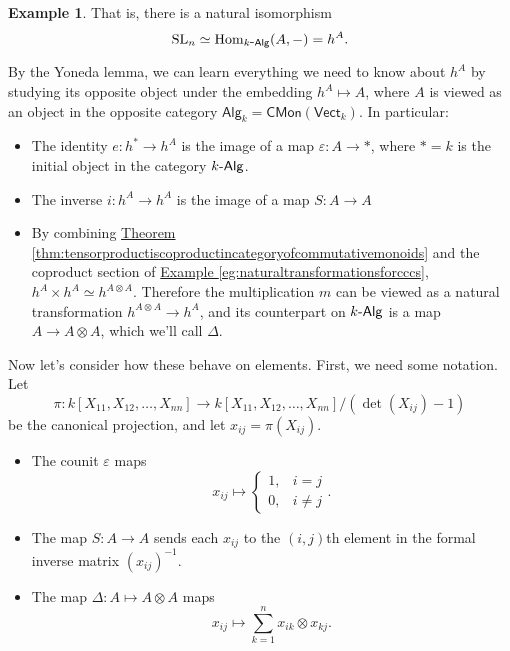 \documentclass[a4paper,10pt]{scrreprt}
\newcommand{\SL}{\mathrm{SL}}
\newcommand{\Hom}{\mathrm{Hom}}
\def\mhyp{{\hbox{-}}}
\theoremstyle{definition}
\newtheorem{example}{Example}[section]
\theoremstyle{plain}
\theoremstyle{remark}
\begin{document}
\begin{example}
  That is, there is a natural isomorphism 
  \begin{equation*}
    \SL_{n} \simeq \Hom_{k\mhyp\mathsf{Alg}}(A, -) = h^{A}.
  \end{equation*}

  By the Yoneda lemma, we can learn everything we need to know about $h^{A}$ by studying its opposite object under the embedding $h^{A} \mapsto A$, where $A$ is viewed as an object in the opposite category $\mathsf{Alg}_{k} = \mathsf{CMon}(\mathsf{Vect}_{k})$. In particular: 
  \begin{itemize}
    \item The identity $e\colon h^{*} \to h^{A}$ is the image of a map $\varepsilon\colon A \to *$, where $* = k$ is the initial object in the category $k\mhyp\mathsf{Alg}$.

    \item The inverse $i\colon h^{A} \to h^{A}$ is the image of a map $S\colon A \to A$

    \item By combining \hyperref[thm:tensorproductiscoproductincategoryofcommutativemonoids]{Theorem \ref*{thm:tensorproductiscoproductincategoryofcommutativemonoids}} and the coproduct section of \hyperref[eg:naturaltransformationsforcccs]{Example \ref*{eg:naturaltransformationsforcccs}}, $h^{A} \times h^{A} \simeq h^{A \otimes A}$. Therefore the multiplication $m$ can be viewed as a natural transformation $h^{A \otimes A} \to h^{A}$, and its counterpart on $k\mhyp\mathsf{Alg}$ is a map $A \to A \otimes A$, which we'll call $\Delta$.
  \end{itemize}

  Now let's consider how these behave on elements. First, we need some notation. Let 
  \begin{equation*}
    \pi\colon k[X_{11}, X_{12}, \ldots, X_{nn}] \to k[X_{11}, X_{12}, \ldots, X_{nn}]/(\det(X_{ij}) - 1)
  \end{equation*}
  be the canonical projection, and let $x_{ij} = \pi(X_{ij})$.

  \begin{itemize}
    \item The counit $\varepsilon$ maps 
      \begin{equation*}
        x_{ij} \mapsto 
        \begin{cases}
          1, &i = j\\
          0, &i \neq j
        \end{cases}.
      \end{equation*}

    \item The map $S\colon A \to A$ sends each $x_{ij}$ to the $(i, j)$th element in the formal inverse matrix $(x_{ij})^{-1}$.

    \item The map $\Delta\colon A \mapsto A \otimes A$ maps
      \begin{equation*}
        x_{ij} \mapsto \sum_{k=1}^{n} x_{ik} \otimes x_{kj}.
      \end{equation*}
  \end{itemize}
\end{example}
\end{document}
